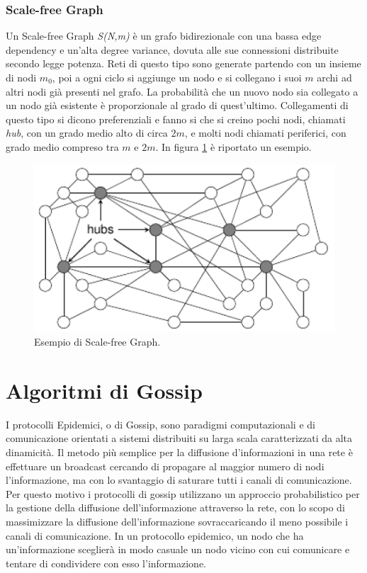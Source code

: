 \subsubsection{Scale-free Graph}
Un Scale-free Graph \textit{S(N,m)} è un grafo bidirezionale con una bassa edge dependency e un'alta degree variance, dovuta alle sue connessioni distribuite secondo legge potenza. Reti di questo tipo sono generate partendo con un insieme di nodi $\mathit{m_0}$, poi a ogni ciclo si aggiunge un nodo e si collegano i suoi $\textit{m}$ archi ad altri nodi già presenti nel grafo. La probabilità che un nuovo nodo sia collegato a un nodo già esistente è proporzionale al grado di quest'ultimo. Collegamenti di questo tipo si dicono preferenziali e fanno si che si creino pochi nodi, chiamati \textit{hub}, con un grado medio alto di circa $\textit{2m}$, e molti nodi chiamati periferici, con grado medio compreso tra $\textit{m}$ e $\textit{2m}$. In figura \ref{fig:scale-free} è riportato un esempio.
\bigskip
\begin{figure}[h]
	\centering
	\includegraphics[width=0.7\linewidth,keepaspectratio]{Images/reti/scale-free}
	\caption[Scale-free Graph]{Esempio di Scale-free Graph\cite{comparisonGAonRT2014-ita}.}
	\label{fig:scale-free}
\end{figure}
\medskip

\section{Algoritmi di Gossip}
I protocolli Epidemici, o di Gossip, sono paradigmi computazionali e di comunicazione orientati a sistemi distribuiti su larga scala caratterizzati da alta dinamicità. Il metodo più semplice per la diffusione d'informazioni in una rete è effettuare un broadcast cercando di propagare al maggior numero di nodi l'informazione, ma con lo svantaggio di saturare tutti i canali di comunicazione. Per questo motivo i protocolli di gossip utilizzano un approccio probabilistico per la gestione della diffusione dell'informazione attraverso la rete, con lo scopo di massimizzare la diffusione dell'informazione sovraccaricando il meno possibile i canali di comunicazione. In un protocollo epidemico, un nodo che ha un'informazione sceglierà in modo casuale un nodo vicino con cui comunicare e tentare di condividere con esso l'informazione.

